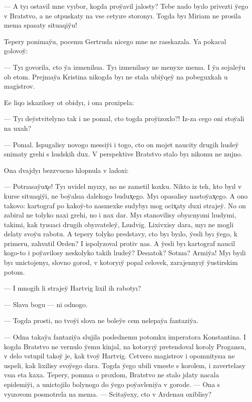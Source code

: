 \documentclass[10pt]{book}
\begin{document}
— A tyı ostavil mne vyıbor, kogda proy̆avil jalosty? Tebe nado byılo privezti y̆ego v Bratstvo, a ne otpuskaty na vse cetyıre storonyı. Togda byı Miriam ne prosila menıa spasaty situaqiy̆u!

Tepery ponimay̆u, pocemu Gertruda nicego mne ne rasskazala. Ya pokacal golovoy̆:

— Tyı govorila, cto y̆a izmenilsıa. Tyı izmenilasy ne menyxe menıa. I y̆a sojaley̆u ob etom. Prejnıay̆a Kristina nikogda byı ne stala ubiy̆qey̆ na pobeguxkah u magistrov.

Ee liqo iskazilosy ot obidyı, i ona proxipela:

— Tyı dey̆stvitelyno tak i ne ponıal, cto togda proy̆izoxlo?! Iz-za cego oni stoy̆ali na uxah?

— Ponıal. Ispugalisy novogo messiy̆i i togo, cto on mojet naucity drugih lıudey̆ snimaty grehi s lıudskih dux. V perspektive Bratstvo stalo byı nikomu ne nujno.

Ona dvajdyı bezzvucno hlopnula v ladoxi:

— Potrıasay̆ux̨e! Tyı uvidel myıxy, no ne zametil koxku. Nikto iz teh, kto byıl v kurse situaqiy̆i, ne boy̆alsıa dalekogo budux̨ego. Myı opasalisy nastoy̆ax̨ego. A ono takovo: kartograf po kakoy̆-to nasmexke sudybyı mog ocix̨aty duxi strajey̆. No on zabiral ne tolyko naxi grehi, no i nax dar. Myı stanovilisy obyıcnyımi lıudymi, takimi, kak tyısıaci drugih obyıvateley̆, Lıudvig. Lixivxisy dara, myı ne mogli delaty svoy̆u rabotu. A tepery tolyko predstavy, cto byı byılo, y̆esli byı y̆ego, k primeru, zahvatil Orden? I ispolyzoval protiv nas. A y̆esli byı kartograf naucil kogo-to i poy̆avilosy neskolyko takih lıudey̆? Desıatok? Sotnıa? Armiy̆a! Myı byıli byı unictojenyı, slovno gorod, v kotoryıy̆ popal celovek, zarajennyıy̆ y̆ustirskim potom.

— I mnogih li strajey̆ Hartvig lixil ih rabotyı?

— Slava bogu — ni odnogo.

— Togda prosti, no tvoy̆i slova ne boley̆e cem nelepay̆a fantaziy̆a.

— Odna takay̆a fantaziy̆a slujila poslednemu potomku imperatora Konstantina. I kogda Bratstvo ne vernulo y̆emu kinjal, na kotoryıy̆ pretendoval koroly Progansu, v delo vstupil takoy̆ je, kak tvoy̆ Hartvig. Cetvero magistrov i opomnitysıa ne uspeli, kak lixilisy svoy̆ego dara. Togda y̆ego ubili vmeste s korolem, i zavertelasy vsıa eta kaxa. Tepery, pomnıa o proxlom, Bratstvo ne stalo jdaty nacala epidemiy̆i, a unictojilo bolynogo do y̆ego poy̆avleniy̆a v gorode. — Ona s vyızovom posmotrela na menıa. — Scitay̆exy, cto v Ardenau oxiblisy?
\end{document}
